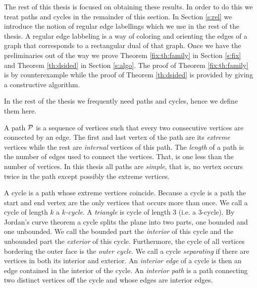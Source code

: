   The rest of this thesis is focused on obtaining these results.
  In order to do this we treat paths and cycles in the remainder of this section. In Section \ref{s:rel} we introduce the notion of regular edge labellings which we use in the rest of the thesis. A regular edge labbeling is a way of coloring and orienting the edges of a graph that corresponds to a rectangular dual of that graph.
  Once we have the preliminaries out of the way we prove Theorem \ref{fix:th:family} in Section \ref{s:fix} and Theorem \ref{th:dsided} in Section \ref{s:algo}. The proof of Theorem \ref{fix:th:family} is by counterexample while the proof of Theorem \ref{th:dsided} is provided by giving a constructive algorithm.


  In the rest of the thesis we frequently need paths and cycles, hence we define them here.

  A path $\P$ is a sequence of vertices such that every two consecutive vertices are connected by an edge. The first and last vertex of the path are its \emph{extreme} vertices while the rest are \emph{internal} vertices of this path. The \emph{length} of a path is the number of edges used to connect the vertices. That, is one less than the number of vertices. In this thesis all paths are \emph{simple}, that is, no vertex occurs twice in the path except possibly the extreme vertices.

  A cycle is a path whose extreme vertices coincide. Because a cycle is a path the start and end vertex are the only vertices that occurs more than once. We call a cycle of length $k$  a \emph{$k$-cycle}. A \emph{triangle} is cycle of length $3$ (i.e. a $3$-cycle). By Jordan's curve theorem a cycle splits the plane into two parts, one bounded and one unbounded. We call the bounded part the \emph{interior} of this cycle and the unbounded part the \emph{exterior} of this cycle.
  Furthermore, the cycle of all vertices bordering the outer face is the \emph{outer cycle}.
  We call a cycle \emph{separating} if there are vertices in both its interior and exterior.
  An \emph{interior edge} of a cycle is then an edge contained in the interior of the cycle.
  An \emph{interior path} is a path connecting two distinct vertices off the cycle and whose edges are interior edges.
